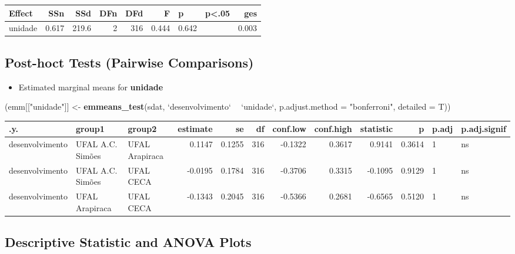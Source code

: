 \documentclass[]{article}
\newenvironment{Shaded}{\begin{snugshade}}{\end{snugshade}}
\newcommand{\DataTypeTok}[1]{\textcolor[rgb]{0.13,0.29,0.53}{#1}}
\newcommand{\KeywordTok}[1]{\textcolor[rgb]{0.13,0.29,0.53}{\textbf{#1}}}
\newcommand{\NormalTok}[1]{#1}
\newcommand{\OperatorTok}[1]{\textcolor[rgb]{0.81,0.36,0.00}{\textbf{#1}}}
\newcommand{\StringTok}[1]{\textcolor[rgb]{0.31,0.60,0.02}{#1}}
\providecommand{\tightlist}{%
  \setlength{\itemsep}{0pt}\setlength{\parskip}{0pt}}
\begin{document}
\begin{longtable}[]{@{}lrrrrrllr@{}}
\toprule
Effect & SSn & SSd & DFn & DFd & F & p & p\textless{}.05 &
ges\tabularnewline
\midrule
\endhead
unidade & 0.617 & 219.6 & 2 & 316 & 0.444 & 0.642 & &
0.003\tabularnewline
\bottomrule
\end{longtable}

\hypertarget{post-hoct-tests-pairwise-comparisons}{%
\subsection{Post-hoct Tests (Pairwise
Comparisons)}\label{post-hoct-tests-pairwise-comparisons}}

\begin{itemize}
\tightlist
\item
  Estimated marginal means for \textbf{unidade}
\end{itemize}

\begin{Shaded}
\begin{Highlighting}[]
\NormalTok{(emm[[}\StringTok{"unidade"}\NormalTok{]] <-}\StringTok{ }\KeywordTok{emmeans_test}\NormalTok{(sdat, }\StringTok{`}\DataTypeTok{desenvolvimento}\StringTok{`} \OperatorTok{~}\StringTok{ `}\DataTypeTok{unidade}\StringTok{`}\NormalTok{, }\DataTypeTok{p.adjust.method =} \StringTok{"bonferroni"}\NormalTok{, }\DataTypeTok{detailed =}\NormalTok{ T))}
\end{Highlighting}
\end{Shaded}

\begin{longtable}[]{@{}lllrrrrrrrll@{}}
\toprule
.y. & group1 & group2 & estimate & se & df & conf.low & conf.high &
statistic & p & p.adj & p.adj.signif\tabularnewline
\midrule
\endhead
desenvolvimento & UFAL A.C. Simões & UFAL Arapiraca & 0.1147 & 0.1255 &
316 & -0.1322 & 0.3617 & 0.9141 & 0.3614 & 1 & ns\tabularnewline
desenvolvimento & UFAL A.C. Simões & UFAL CECA & -0.0195 & 0.1784 & 316
& -0.3706 & 0.3315 & -0.1095 & 0.9129 & 1 & ns\tabularnewline
desenvolvimento & UFAL Arapiraca & UFAL CECA & -0.1343 & 0.2045 & 316 &
-0.5366 & 0.2681 & -0.6565 & 0.5120 & 1 & ns\tabularnewline
\bottomrule
\end{longtable}

\hypertarget{descriptive-statistic-and-anova-plots}{%
\subsection{Descriptive Statistic and ANOVA
Plots}\label{descriptive-statistic-and-anova-plots}}
\end{document}
